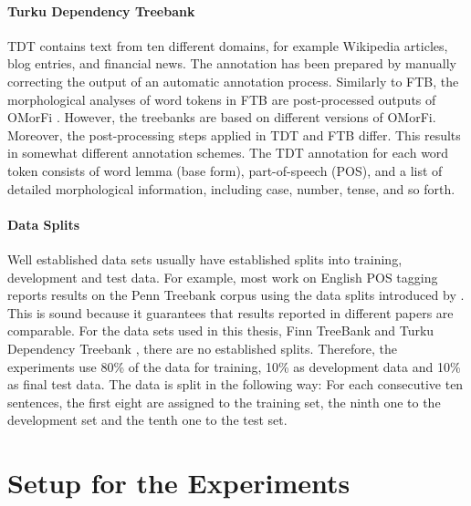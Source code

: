 \paragraph{Turku Dependency Treebank} TDT contains text from ten different domains, for example Wikipedia articles, blog entries, and financial news. The annotation has been prepared by manually correcting the output of an automatic annotation process.
Similarly to FTB, the morphological analyses of word tokens in FTB are
post-processed outputs of OMorFi \citep{Pirinen2011}. However, the
treebanks are based on different versions of OMorFi. Moreover, the
post-processing steps applied in TDT and FTB differ. This results in
somewhat different annotation schemes.  The TDT annotation for each
word token consists of word lemma (base form), part-of-speech (POS),
and a list of detailed morphological information, including case,
number, tense, and so forth.

\paragraph{Data Splits} Well established data sets usually have
established splits into training, development and test data. For
example, most work on English POS tagging reports results on the Penn
Treebank corpus \citep{Marcus1993} using the data splits introduced by
\cite{Collins2002}. This is sound because it guarantees that results
reported in different papers are comparable. For the data sets used in
this thesis, Finn TreeBank \citep{Voutilainen2011} and Turku
Dependency Treebank \citep{Haverinen2013}, there are no established
splits. Therefore, the experiments use 80\% of the data for training,
10\% as development data and 10\% as final test data. The data is
split in the following way: For each consecutive ten sentences, the
first eight are assigned to the training set, the ninth one to the
development set and the tenth one to the test set.

\section{Setup for the Experiments}


